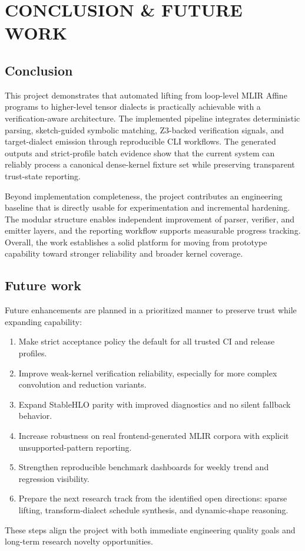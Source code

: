 \chapter{CONCLUSION \& FUTURE WORK}
\section{Conclusion}
This project demonstrates that automated lifting from loop-level MLIR Affine programs to higher-level tensor dialects is practically achievable with a verification-aware architecture. The implemented pipeline integrates deterministic parsing, sketch-guided symbolic matching, Z3-backed verification signals, and target-dialect emission through reproducible CLI workflows. The generated outputs and strict-profile batch evidence show that the current system can reliably process a canonical dense-kernel fixture set while preserving transparent trust-state reporting.

Beyond implementation completeness, the project contributes an engineering baseline that is directly usable for experimentation and incremental hardening. The modular structure enables independent improvement of parser, verifier, and emitter layers, and the reporting workflow supports measurable progress tracking. Overall, the work establishes a solid platform for moving from prototype capability toward stronger reliability and broader kernel coverage.

\section{Future work}
Future enhancements are planned in a prioritized manner to preserve trust while expanding capability:
\begin{enumerate}
\item Make strict acceptance policy the default for all trusted CI and release profiles.
\item Improve weak-kernel verification reliability, especially for more complex convolution and reduction variants.
\item Expand StableHLO parity with improved diagnostics and no silent fallback behavior.
\item Increase robustness on real frontend-generated MLIR corpora with explicit unsupported-pattern reporting.
\item Strengthen reproducible benchmark dashboards for weekly trend and regression visibility.
\item Prepare the next research track from the identified open directions: sparse lifting, transform-dialect schedule synthesis, and dynamic-shape reasoning.
\end{enumerate}

These steps align the project with both immediate engineering quality goals and long-term research novelty opportunities.
